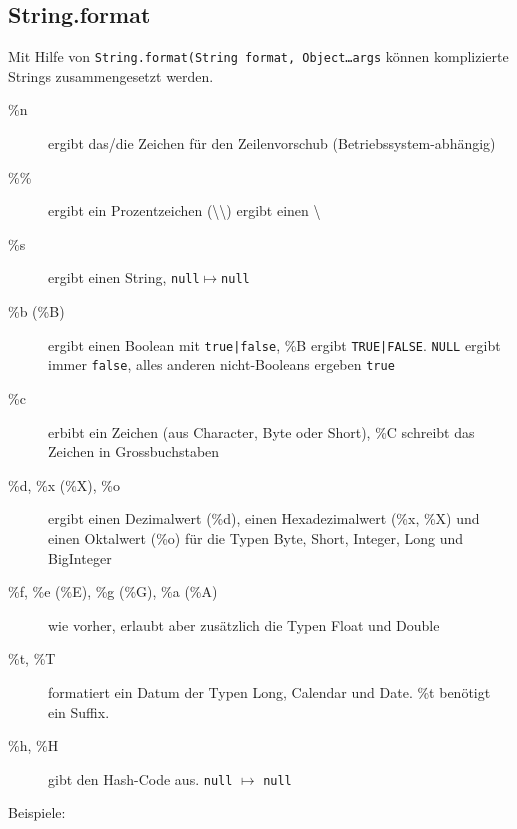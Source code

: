 \subsection{String.format}
Mit Hilfe von \texttt{String.format(String format, Object\dots args} können komplizierte Strings zusammengesetzt werden.
\begin{description}
	\item [\%n] ergibt das/die Zeichen für den Zeilenvorschub (Betriebssystem-abhängig)
	\item [\%\%] ergibt ein Prozentzeichen (\textbackslash\textbackslash) ergibt einen \textbackslash
	\item [\%s] ergibt einen String, \texttt{null}$\mapsto$\texttt{null}
	\item [\%b (\%B)] ergibt einen Boolean mit \texttt{true|false}, \%B ergibt \texttt{TRUE|FALSE}. \texttt{NULL} ergibt immer \texttt{false}, alles anderen nicht-Booleans ergeben \texttt{true}
	\item [\%c] erbibt ein Zeichen (aus Character, Byte oder Short), \%C schreibt das Zeichen in Grossbuchstaben
	\item [\%d, \%x (\%X), \%o] ergibt einen Dezimalwert (\%d), einen Hexadezimalwert (\%x, \%X) und einen Oktalwert (\%o) für die Typen Byte, Short, Integer, Long und BigInteger
	\item [\%f, \%e (\%E), \%g (\%G), \%a (\%A)] wie vorher, erlaubt aber zusätzlich die Typen Float und Double
	\item [\%t, \%T] formatiert ein Datum der Typen Long, Calendar und Date. \%t benötigt ein Suffix.
	\item [\%h, \%H] gibt den Hash-Code aus. \texttt{null} $\mapsto$ \texttt{null}
\end{description}
Beispiele:
